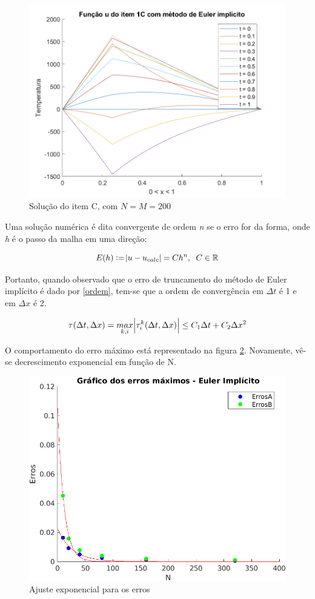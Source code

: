 \documentclass[12pt]{article}
\begin{document}
\begin{spacing}{1.5}
\begin{figure}[ht!]
    \centering
    \includegraphics[width=0.45\linewidth]{Segunda_Tarefa/ItemB/itemC_2D.png}
    \caption{Solução do item C, com $N=M=200$}
    \label{fig:Tarefa2B_itemC_2D}
\end{figure}

Uma solução numérica é dita convergente de ordem \textit{n} se o erro for da forma\supercite{leVeque}, onde \textit{h} é o passo da malha em uma direção:

\begin{equation}\label{erro_proporcional}
    E(h):=\abs{u-u_{calc}}=C h^n, \;\;C \in \mathbb{R}
\end{equation}

Portanto, quando observado que o erro de truncamento do método de Euler implícito é dado por \eqref{ordem}, tem-se que a ordem de convergência em $\Delta t$ é 1 e em $\Delta x$ é 2.

\begin{equation}\label{ordem}
    \tau(\Delta t, \Delta x)= \underset{k,i}{max}\abs{\tau^k_i(\Delta t,\Delta x)} \leq C_1\Delta t + C_2 \Delta x^2
\end{equation}

\clearpage
O comportamento do erro máximo está representado na figura \ref{fig:2B_Fit_Erro}. Novamente, vê-se decrescimento exponencial em função de N.

\begin{figure}[ht!]
    \centering
    \includegraphics[width=0.65\linewidth]{Segunda_Tarefa/ItemB/erro_euler.png}
    \caption{Ajuste exponencial para os erros}
    \label{fig:2B_Fit_Erro}
\end{figure} 


\end{spacing}
\end{document}
